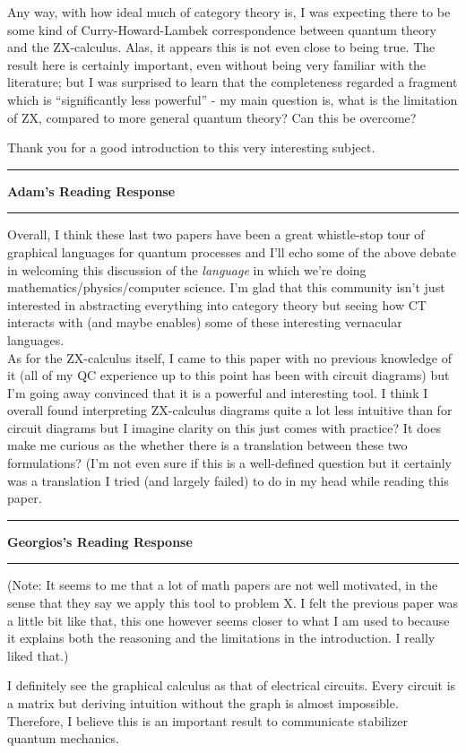 \documentclass{amsart}
\newcommand{\iam}[1]{
  \vspace{0.25em}
  \hrule
  \vspace{0.25em}
  \textbf{{#1}'s Reading Response}
  \vspace{0.25em}
  \hrule
  \vspace{1em}
}
\begin{document}
Any way, with how ideal much of category theory is, I was expecting there to be some kind of Curry-Howard-Lambek correspondence between quantum theory and the ZX-calculus. Alas, it appears this is not even close to being true. The result here is certainly important, even without being very familiar with the literature; but I was surprised to learn that the completeness regarded a fragment which is ``significantly less powerful'' - my main question is, what is the limitation of ZX, compared to more general quantum theory? Can this be overcome?

Thank you for a good introduction to this very interesting subject.

\iam{Adam}
Overall, I think these last two papers have been a great whistle-stop tour of graphical languages for quantum processes and I'll echo some of the above debate in welcoming this discussion of the \textit{language} in which we're doing mathematics/physics/computer science. I'm glad that this community isn't just interested in abstracting everything into category theory but seeing how CT interacts with (and maybe enables) some of these interesting vernacular languages. \\
As for the ZX-calculus itself, I came to this paper with no previous knowledge of it (all of my QC experience up to this point has been with circuit diagrams) but I'm going away convinced that it is a powerful and interesting tool. I think I overall found interpreting ZX-calculus diagrams quite a lot less intuitive than for circuit diagrams but I imagine clarity on this just comes with practice? It does make me curious as the whether there is a translation between these two formulations? (I'm not even sure if this is a well-defined question but it certainly was a translation I tried (and largely failed) to do in my head while reading this paper. \\

\iam{Georgios}

(Note: It seems to me that a lot of math papers are not well motivated,
in the sense that they say we apply this tool to problem X.
I felt the previous paper was a little bit like that,
this one however seems closer to what I am used to because
it explains both the reasoning and the limitations in the introduction.
I really liked that.)

I definitely see the graphical calculus as
that of electrical circuits.
Every circuit is a matrix but deriving
intuition without the graph is almost impossible.
Therefore, I believe this is an important result
to communicate stabilizer quantum mechanics.
\end{document}

